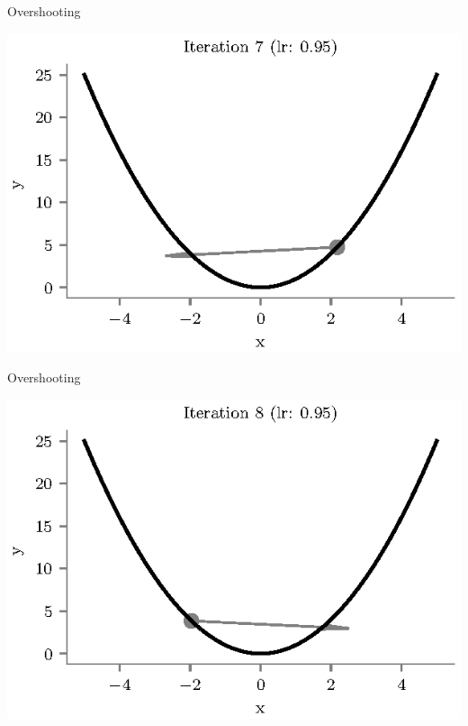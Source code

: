 \documentclass{beamer}
\begin{document}
\begin{frame}{Overshooting}
\begin{center}
\includegraphics[totalheight=6cm]{overshooting-7.eps}
\end{center}
\end{frame}

\begin{frame}{Overshooting}
\begin{center}
\includegraphics[totalheight=6cm]{overshooting-8.eps}
\end{center}
\end{frame}
\end{document}
